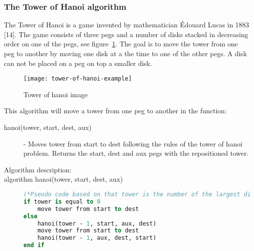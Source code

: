 \documentclass {article}
\begin{document}
\subsubsection{The Tower of Hanoi algorithm}
The Tower of Hanoi is a game invented by mathematician Édouard Lucas in 1883 [14]. The game consists of three pegs and a number of disks stacked in decreasing order on one of the pegs, see figure~\ref{fig:tower-of-hanoi-example}. The goal is to move the tower from one peg to another by moving one disk at a the time to one of the other pegs. A disk can not be placed on a peg on top a smaller disk. 

\begin{figure}[H]
\texttt{[image: tower-of-hanoi-example]}

\caption{Tower of hanoi image}
\label{fig:tower-of-hanoi-example}
\end{figure}

This algorithm will move a tower from one peg to another in the function:

\begin{description}
\item[hanoi(tower, start, dest, aux)] - Moves tower from start to dest following the rules of the tower of hanoi problem. Returns the start, dest and aux pegs with the repositioned tower.


\item[Algorithm description:]
\item[algorithm hanoi(tower, start, dest, aux)]
\item[] 
\begin{lstlisting}[language=Pascal]
(*Pseudo code based on that tower is the number of the largest disk, where 0 is the smallest disk in the tower.*)
if tower is equal to 0
 	move tower from start to dest
else
 	hanoi(tower - 1, start, aux, dest)
 	move tower from start to dest
 	hanoi(tower - 1, aux, dest, start)
end if
\end{lstlisting}
\end{description}
\end{document}
